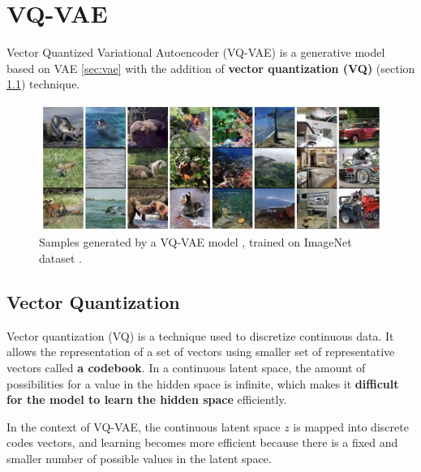 \section{VQ-VAE}
\label{vqvae}

Vector Quantized Variational Autoencoder (VQ-VAE) \cite{vqvae} is a generative model based on VAE \ref{sec:vae} with the addition of \textbf{vector quantization (VQ)} (section \ref{vq}) technique. 


\begin{figure}[h]
    \centering
    \includegraphics[width=\textwidth]{images/vqvae_samples.png}
    \caption{Samples generated by a VQ-VAE model \cite{vqvae}, trained on ImageNet dataset \cite{vqvae}.}
\end{figure}










\subsection{Vector Quantization}
\label{vq}

Vector quantization (VQ) is a technique used to discretize continuous data. It allows the representation of a set of vectors using smaller set of representative vectors called \textbf{a codebook}. In a continuous latent space, the amount of possibilities for a value in the hidden space is infinite, which makes it \textbf{difficult for the model to learn the hidden space} efficiently.

In the context of VQ-VAE, the continuous latent space $z$ is mapped into discrete codes vectors, and learning becomes more efficient because there is a fixed and smaller number of possible values in the latent space.

